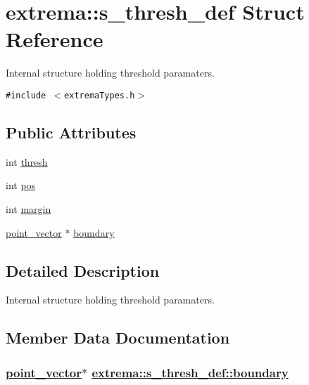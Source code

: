 \hypertarget{structextrema_1_1s__thresh__def}{
\section{extrema::s\_\-thresh\_\-def Struct Reference}
\label{structextrema_1_1s__thresh__def}
}
Internal structure holding threshold paramaters.  


{\tt \#include $<$extrema\-Types.h$>$}

\subsection*{Public Attributes}
\begin{CompactItemize}
\item 
int \hyperlink{structextrema_1_1s__thresh__def_8535832da11ff18be5275c3734e924ed}{thresh}
\item 
int \hyperlink{structextrema_1_1s__thresh__def_37e7b91ca56bddb77fdb699d21abdb72}{pos}
\item 
int \hyperlink{structextrema_1_1s__thresh__def_3e5fd583aab99f1dc00c0fea91cab97c}{margin}
\item 
\hyperlink{namespaceextrema_b08df8a480b75ca2cc69c83e902d5a8e}{point\_\-vector} $\ast$ \hyperlink{structextrema_1_1s__thresh__def_8509715028e75e5da9caa7fcd53b8a1a}{boundary}
\end{CompactItemize}


\subsection{Detailed Description}
Internal structure holding threshold paramaters. 



\subsection{Member Data Documentation}
\hypertarget{structextrema_1_1s__thresh__def_8509715028e75e5da9caa7fcd53b8a1a}{
\subsubsection[boundary]{\setlength{\rightskip}{0pt plus 5cm}\hyperlink{namespaceextrema_b08df8a480b75ca2cc69c83e902d5a8e}{point\_\-vector}$\ast$ \hyperlink{structextrema_1_1s__thresh__def_8509715028e75e5da9caa7fcd53b8a1a}{extrema::s\_\-thresh\_\-def::boundary}}}
\label{structextrema_1_1s__thresh__def_8509715028e75e5da9caa7fcd53b8a1a}


